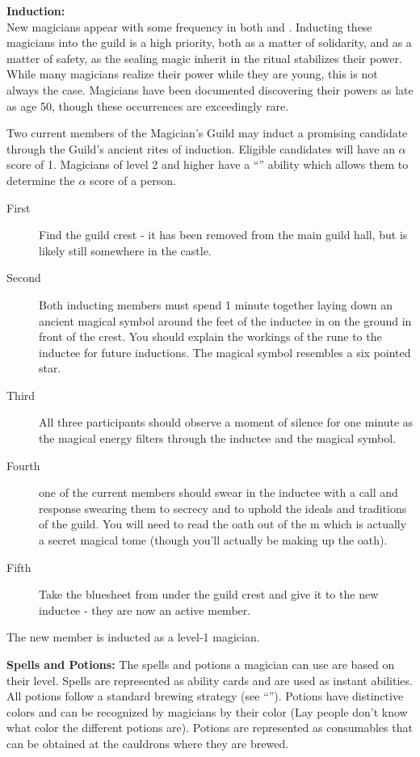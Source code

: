 \documentclass[blue]{NeptuneBall}
\begin{document}
{\bf Induction:}\\
New magicians appear with some frequency in both \pPacifica{} and \pAtlantis{}. Inducting these magicians into the guild is a high priority, both as a matter of solidarity, and as a matter of safety, as the sealing magic inherit in the ritual stabilizes their power. While many magicians realize their power while they are young, this is not always the case. Magicians have been documented discovering their powers as late as age 50, though these occurrences are exceedingly rare.

Two current members of the Magician's Guild may induct a promising candidate through the Guild's ancient rites of induction. Eligible candidates will have an $\alpha$ score of 1. Magicians of level 2 and higher have a ``\aPerceive{}'' ability which allows them to determine the $\alpha$ score of a person.
\begin{description}
\item[First] Find the guild crest - it has been removed from the main guild hall, but is likely still somewhere in the castle. 
\item[Second] Both inducting members must spend 1 minute together laying down an ancient magical symbol around the feet of the inductee in \iChalk{} on the ground in front of the crest. You should explain the workings of the rune to the inductee for future inductions. The magical symbol resembles a six pointed star. 
\item[Third] All three participants should observe a moment of silence for one minute as the magical energy filters through the inductee and the magical symbol. \item[Fourth] one of the current members should swear in the inductee with a call and response swearing them to secrecy and to uphold the ideals and traditions of the guild. You will need to read the oath out of the \iBook{}m which is actually a secret magical tome (though you'll actually be making up the oath). 
\item[Fifth] Take the bluesheet from under the guild crest and give it to the new inductee - they are now an active member.
\end{description}

The new member is inducted as a level-1 magician.

{\bf Spells and Potions:}
The spells and potions a magician can use are based on their level. Spells are represented as ability cards and are used as instant abilities. All potions follow a standard brewing strategy (see ``\gPotions{}''). Potions have distinctive colors and can be recognized by magicians by their color (Lay people don't know what color the different potions are). Potions are represented as consumables that can be obtained at the cauldrons where they are brewed.
\end{document}
